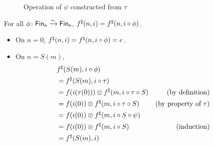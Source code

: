 \begin{figure}[H]
    \centering
    \hspace{1em}
    \caption{Operation of $\psi$ constructed from $\tau$}
    \label{fig:enter-label}
\end{figure}

\begin{theorem}
For all $\phi\colon \Fin[n]\xto{\sim}\Fin[n]$, $\ext{f}(n, i) \id \ext{f}(n, i \circ \phi)$.
\end{theorem}

\begin{itemize}
    \item On $n = 0$, $\ext{f}(n, i) \id \ext{f}(n, i \circ \phi) = e$.
    \item On $n = S(m)$,
        \begin{align*}
        & {f}^{\sharp}(S(m), i \circ \phi) \\
        & = {f}^{\sharp}(S(m), i \circ \tau) \\
        & = f(i(\tau(0))) \otimes {f}^{\sharp}(m, i \circ \tau \circ S) & \text{(by definition)} \\
        & = f(i(0)) \otimes {f}^{\sharp}(m, i \circ \tau \circ S) & \text{(by property of $\tau$)} \\
        & = f(i(0)) \otimes {f}^{\sharp}(m, i \circ S \circ \psi) \\
        & = f(i(0)) \otimes {f}^{\sharp}(m, i \circ S) & \text{(induction)} \\
        & = {f}^{\sharp}(S(m), i)
        \end{align*}
\end{itemize}

